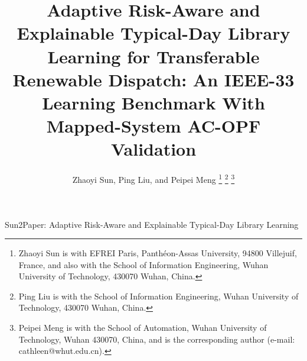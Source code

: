 \documentclass[journal]{IEEEtran}
\begin{document}
\title{Adaptive Risk-Aware and Explainable Typical-Day Library Learning for Transferable Renewable Dispatch: An IEEE-33 Learning Benchmark With Mapped-System AC-OPF Validation}

\author{Zhaoyi Sun, Ping Liu, and Peipei Meng%
\thanks{Zhaoyi Sun is with EFREI Paris, Panth\'eon-Assas University, 94800 Villejuif, France, and also with the School of Information Engineering, Wuhan University of Technology, 430070 Wuhan, China.}%
\thanks{Ping Liu is with the School of Information Engineering, Wuhan University of Technology, 430070 Wuhan, China.}%
\thanks{Peipei Meng is with the School of Automation, Wuhan University of Technology, Wuhan 430070, China, and is the corresponding author (e-mail: cathleen@whut.edu.cn).}}

%
{Sun2Paper: Adaptive Risk-Aware and Explainable Typical-Day Library Learning}

\maketitle
\end{document}
